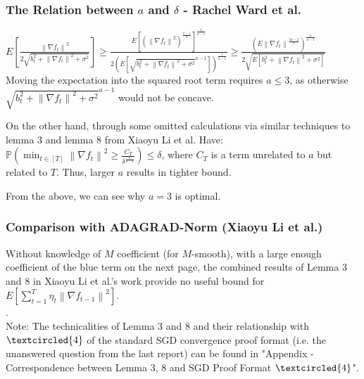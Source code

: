 \documentclass{beamer}
\begin{document}
\begin{frame}
\frametitle{The Relation between $a$ and $\delta$ - Rachel Ward et al.}
$E\left[\frac{\left\|\nabla f_t\right\|^2}{2 \sqrt{b_t^2+\left\|\nabla f_t\right\|^2+\sigma^2}}\right] \geq \frac{E\left[\left(\left\|\nabla f_t\right\|^2\right)^{\frac{a-1}{a}}\right]^{\frac{a}{a-1}}}{2
\left(E\left[\sqrt{b_t^2+\left\|\nabla f_t\right\|^2+\sigma^2}^{a-1}\right]\right)^{\frac{1}{a-1}}} \geq \frac{\left(E\left\|\nabla f_t\right\|^{\frac{2a-2}{a}}\right)^{\frac{a}{a-1}}}{2 \sqrt{E\left[b_t^2+\left\|\nabla f_t\right\|^2+\sigma^2\right]}}$
\\Moving the expectation into the squared root term requires $a\leq3$, as otherwise $\sqrt{b_t^2+\left\|\nabla f_t\right\|^2+\sigma^2}^{a-1}$ would not be concave.\par
On the other hand, through some omitted calculations via similar techniques to lemma 3 and lemma 8 from Xiaoyu Li et al. Have:
$\mathbb{P}\left(\min _{t \in[T]}\left\|\nabla f_t\right\|^2 \geq \frac{C_T}{\delta^{\frac{a}{a-1}}}\right)\leq \delta$, where $C_T$ is a term unrelated to $a$ but related to $T$. Thus, larger $a$ results in tighter bound. \par
From the above, we can see why $a = 3$ is optimal.
\end{frame}

\begin{frame}
\frametitle{Comparison with ADAGRAD-Norm (Xiaoyu Li et al.)}
    Without knowledge of $M$ coefficient (for $M$-smooth), with a large enough coefficient of the blue term on the next page, the combined results of Lemma 3 and 8 in Xiaoyu Li et al.'s work provide no useful bound for $E\left[\sum_{t=1}^T \eta_t\left\|\nabla f_{t-1}\right\|^2\right]$.\\ \color{white}.\color{black}
    \\Note: The technicalities of Lemma 3 and 8 and their relationship with $\textcircled{4}$ of the standard SGD convergence proof format (i.e. the unanswered question from the last report) can be found in "Appendix - Correspondence between Lemma 3, 8 and SGD Proof Format $\textcircled{4}$".
    
\end{frame}
\end{document}
